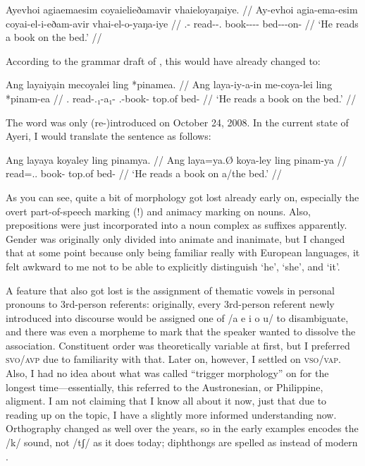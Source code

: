 \ex\begingl
	\gla Ayevhoi agiaemaesim coyaielieðamavir vhaieloyaŋaiye. //
	\glb Ay-evhoi agia-ema-esim coyai-el-i-eðam-avir vhai-el-o-yaŋa-iye //
	\glc \Tsg{}.\An{}-\Sbj{} read-\Vb{}-\Sbj{}.\An{} book-\Nn{}-\An{}-\Indf{}-\Parg{} bed-\Nn{}-\Inan{}-on-\Loc{} //
	\glft `He reads a book on the bed.' //
\endgl\xe

According to the grammar draft of , this would have already 
changed to:

\ex\begingl
	\gla Ang layaiyạin mecoyalei ling *pinamea. //
	\glb Ang laya-iy-a-in me-coya-lei ling *pinam-ea //
	\glc \Aarg{}.\Sbj{} read-\Tsg{}.\An{}₁-a₁-\Sbj{} \Indf{}.\Inan{}-book-\PargI{} top.of bed-\Loc{} //
	\glft `He reads a book on the bed.' //
\endgl\xe

The word  was only (re-)introduced on October 24, 2008. 
In the current state of Ayeri, I would translate the sentence as follows:

\ex\begingl
	\gla Ang layaya koyaley ling pinamya. //
	\glb Ang laya=ya.Ø koya-ley ling pinam-ya //
	\glc \AgtT{} read=\Tsg{}.\M{}.\Top{} book-\PargI{} top.of bed-\Loc{} //
	\glft `He reads a book on a/the bed.' //
\endgl\xe

As you can see, quite a bit of morphology got lost already early on, especially 
the overt part-of-speech marking (!) and animacy marking on nouns. Also, 
prepositions were just incorporated into a noun complex as suffixes apparently. 
Gender was originally only divided into animate and inanimate, but I changed 
that at some point because only being familiar really with European languages, 
it felt awkward to me not to be able to explicitly distinguish `he', `she', and 
`it'.

A feature that also got lost is the assignment of thematic vowels in personal 
pronouns to 3rd-person referents: originally, every 3rd-person referent newly 
introduced into discourse would be assigned one of /a e i o u/ to disambiguate, 
and there was even a morpheme to mark that the speaker wanted to dissolve the 
association. Constituent order was theoretically variable at first, but I 
preferred \textsc{svo/avp} due to familiarity with that. Later on, however, I 
settled on \textsc{vso/vap}. Also, I had no idea about what was called 
``trigger morphology'' on  for the longest time---essentially, 
this referred to the Austronesian, or Philippine, aligment. I am not claiming 
that I know all about it now, just that due to reading up on the topic, I have 
a slightly more informed understanding now. Orthography changed as well over 
the years, so  in the early examples encodes the /k/ sound, not /tʃ/ as 
it does today; diphthongs are spelled as  instead of modern .


